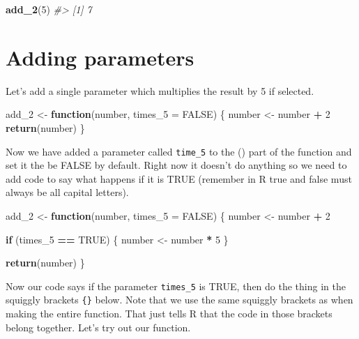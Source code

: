 \documentclass[
  12pt,
]{book}
\newenvironment{Shaded}{\begin{snugshade}}{\end{snugshade}}
\newcommand{\CommentTok}[1]{\textcolor[rgb]{0.37,0.37,0.37}{\textit{#1}}}
\newcommand{\ControlFlowTok}[1]{\textcolor[rgb]{0.27,0.27,0.27}{\textbf{#1}}}
\newcommand{\DataTypeTok}[1]{\textcolor[rgb]{0.27,0.27,0.27}{#1}}
\newcommand{\DecValTok}[1]{\textcolor[rgb]{0.06,0.06,0.06}{#1}}
\newcommand{\KeywordTok}[1]{\textcolor[rgb]{0.27,0.27,0.27}{\textbf{#1}}}
\newcommand{\NormalTok}[1]{#1}
\newcommand{\OperatorTok}[1]{\textcolor[rgb]{0.43,0.43,0.43}{\textbf{#1}}}
\newcommand{\OtherTok}[1]{\textcolor[rgb]{0.37,0.37,0.37}{#1}}
\newcommand{\StringTok}[1]{\textcolor[rgb]{0.5,0.5,0.5}{#1}}
\begin{document}
\begin{Shaded}
\begin{Highlighting}[]
\KeywordTok{add\_2}\NormalTok{(}\DecValTok{5}\NormalTok{)}
\CommentTok{\#> [1] 7}
\end{Highlighting}
\end{Shaded}

\hypertarget{adding-parameters}{%
\section{Adding parameters}\label{adding-parameters}}

Let's add a single parameter which multiplies the result by 5 if selected.

\begin{Shaded}
\begin{Highlighting}[]
\NormalTok{add\_}\DecValTok{2}\NormalTok{ <{-}}\StringTok{ }\ControlFlowTok{function}\NormalTok{(number, }\DataTypeTok{times\_5 =} \OtherTok{FALSE}\NormalTok{) \{}
\NormalTok{  number <{-}}\StringTok{ }\NormalTok{number }\OperatorTok{+}\StringTok{ }\DecValTok{2}
  \KeywordTok{return}\NormalTok{(number)}
\NormalTok{\}}
\end{Highlighting}
\end{Shaded}

Now we have added a parameter called \texttt{time\_5} to the () part of the function and set it the be FALSE by default. Right now it doesn't do anything so we need to add code to say what happens if it is TRUE (remember in R true and false must always be all capital letters).

\begin{Shaded}
\begin{Highlighting}[]
\NormalTok{add\_}\DecValTok{2}\NormalTok{ <{-}}\StringTok{ }\ControlFlowTok{function}\NormalTok{(number, }\DataTypeTok{times\_5 =} \OtherTok{FALSE}\NormalTok{) \{}
\NormalTok{  number <{-}}\StringTok{ }\NormalTok{number }\OperatorTok{+}\StringTok{ }\DecValTok{2}
  
  \ControlFlowTok{if}\NormalTok{ (times\_}\DecValTok{5} \OperatorTok{==}\StringTok{ }\OtherTok{TRUE}\NormalTok{) \{}
\NormalTok{    number <{-}}\StringTok{ }\NormalTok{number }\OperatorTok{*}\StringTok{ }\DecValTok{5}
\NormalTok{  \}}
  
  \KeywordTok{return}\NormalTok{(number)}
\NormalTok{\}}
\end{Highlighting}
\end{Shaded}

Now our code says if the parameter \texttt{times\_5} is TRUE, then do the thing in the squiggly brackets \texttt{\{\}} below. Note that we use the same squiggly brackets as when making the entire function. That just tells R that the code in those brackets belong together. Let's try out our function.
\end{document}
